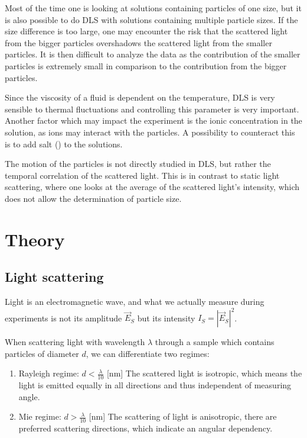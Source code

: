 \documentclass{article}
\begin{document}
Most of the time one is looking at solutions containing particles of one size, but it is also possible to do DLS with solutions containing multiple particle sizes. If the size difference is too large, one may encounter the risk that the scattered light from the bigger particles overshadows the scattered light from the smaller particles. It is then difficult to analyze the data as the contribution of the smaller particles is extremely small in comparison to the contribution from the bigger particles.

Since the viscosity of a fluid is dependent on the temperature, DLS is very sensible to thermal fluctuations and controlling this parameter is very important. Another factor which may impact the experiment is the ionic concentration in the solution, as ions may interact with the particles. A possibility to counteract this is to add salt () to the solutions. 

The motion of the particles is not directly studied in DLS, but rather the temporal correlation of the scattered light. This is in contrast to static light scattering, where one looks at the average of the scattered light's intensity, which does not allow the determination of particle size. 

\section{Theory}

\subsection{Light scattering}
Light is an electromagnetic wave, and what we actually measure during experiments is not its amplitude  $\Vec{E}_S$ but its intensity $I_S = |\Vec{E}_S|^2$.

When scattering light with wavelength $\lambda$ through a sample which contains particles of diameter $d$, we can differentiate two regimes:
\begin{enumerate}
    \item Rayleigh regime: $d < \frac{\lambda}{10}$ [nm] \newline
    The scattered light is isotropic, which means the light is emitted equally in all directions and thus independent of measuring angle.
    
    \item Mie regime: $d > \frac{\lambda}{10}$ [nm] \newline
    The scattering of light is anisotropic, there are preferred scattering directions, which indicate an angular dependency.
\end{enumerate}
\end{document}
